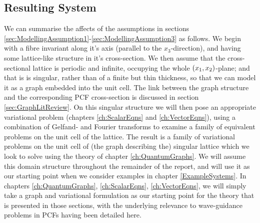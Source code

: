 
\subsection{Resulting System} \label{sec:OurSystem}
We can summarise the affects of the assumptions in sections \ref{sec:ModellingAssumption1}-\ref{sec:ModellingAssumption3} as follows.
We begin with a fibre invariant along it's axis (parallel to the $x_3$-direction), and having some lattice-like structure in it's cross-section.
We then assume that the cross-sectional lattice is periodic and infinite, occupying the whole $\left( x_1,x_2 \right)$-plane; and that is is singular, rather than of a finite but thin thickness, so that we can model it as a graph embedded into the unit cell.
The link between the graph structure and the corresponding PCF cross-section is discussed in section \ref{sec:GraphLitReview}.
On this singular structure we will then pose an appropriate variational problem (chapters \ref{ch:ScalarEqns} and \ref{ch:VectorEqns}), using a combination of Gelfand- and Fourier transforms to examine a family of equivalent problems on the unit cell of the lattice.
The result is a family of variational problems on the unit cell of (the graph describing the) singular lattice which we look to solve using the theory of chapter \ref{ch:QuantumGraphs}.
We will assume this domain structure throughout the remainder of the report, and will use it as our starting point when we consider examples in chapter \ref{ExampleSystems}.
In chapters \ref{ch:QuantumGraphs}, \ref{ch:ScalarEqns}, \ref{ch:VectorEqns}, we will simply take a graph and variational formulation as our starting point for the theory that is presented in those sections, with the underlying relevance to wave-guidance problems in PCFs having been detailed here.

